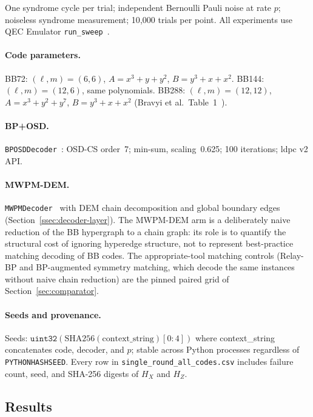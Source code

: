 \documentclass[11pt,a4paper]{article}
\begin{document}
One syndrome cycle per trial; independent Bernoulli Pauli noise at rate $p$;
noiseless syndrome measurement; 10{,}000 trials per point.
All experiments use QEC Emulator
\texttt{run\_sweep}~\cite{AlDaajeh2026emulator}.

\paragraph{Code parameters.}
BB72: $(\ell,m)=(6,6)$, $A=x^3+y+y^2$, $B=y^3+x+x^2$.
BB144: $(\ell,m)=(12,6)$, same polynomials.
BB288: $(\ell,m)=(12,12)$, $A=x^3+y^2+y^7$, $B=y^3+x+x^2$
(Bravyi et al.\ Table~1~\cite{Bravyi2024}).

\paragraph{BP+OSD.}
\texttt{BPOSDDecoder}~\cite{AlDaajeh2026emulator,ldpcPackage}:
OSD-CS order~7; min-sum, scaling~0.625; 100 iterations; ldpc v2 API.

\paragraph{MWPM-DEM.}
\texttt{MWPMDecoder}~\cite{AlDaajeh2026emulator,Higgott2023}
with DEM chain decomposition and global boundary edges
(Section~\ref{ssec:decoder-layer}).
The MWPM-DEM arm is a deliberately naive reduction of the BB
hypergraph to a chain graph: its role is to quantify the structural
cost of ignoring hyperedge structure, not to represent best-practice
matching decoding of BB codes. The appropriate-tool matching controls
(Relay-BP and BP-augmented symmetry matching, which decode the same
instances without naive chain reduction) are the pinned paired grid of
Section~\ref{sec:comparator}.

\paragraph{Seeds and provenance.}
Seeds: $\texttt{uint32}(\mathrm{SHA256}(\mathrm{context\_string})[0{:}4])$
where context\_string concatenates code, decoder, and $p$;
stable across Python processes regardless of \texttt{PYTHONHASHSEED}.
Every row in \texttt{single\_round\_all\_codes.csv} includes
failure count, seed, and SHA-256 digests of $H_X$ and $H_Z$.

\subsection{Results}
\end{document}
